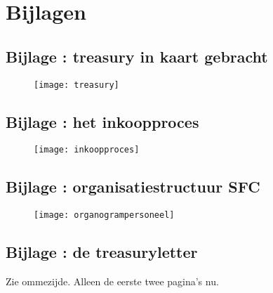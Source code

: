 \newpage
\section*{Bijlagen}

\subsection*{Bijlage \thebijlage: \gls{treasury} in kaart gebracht}
\label{bij:treasury}
\begin{figure}[!hb]
    \centering
    \texttt{[image: treasury]}
    \label{fig:mmtreasury}
\end{figure}

\newpage
{}
\subsection*{\hypertarget{bij:inkoopproces}{Bijlage \thebijlage}: het inkoopproces}
\begin{figure}[!ht]
    \centering
    \texttt{[image: inkoopproces]}
    \label{fig:inkoopproces}
\end{figure}

\newpage
{}
\subsection*{\hypertarget{bij:organisatiepers}{Bijlage \thebijlage}: organisatiestructuur SFC}
\begin{figure}[!ht]
    \centering
    \texttt{[image: organogrampersoneel]}
\end{figure}

\newpage
{}
\subsection*{\hypertarget{bij:treasury}{Bijlage \thebijlage}: de \gls{treasuryletter}}
Zie ommezijde. {\color{red}Alleen de eerste twee pagina's nu.}
\vfill
\begin{center}
\end{center}


